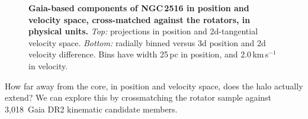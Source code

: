 \documentclass[12pt,twocolumn,tighten]{aastex63}
\newcommand{\nkinematic}{3{,}018\ } %
\begin{document}
\begin{figure}[t]
	\begin{center}
		\leavevmode
	
	\end{center}
	\vspace{-0.7cm}
	\caption{ {\bf Gaia-based components of NGC\,2516 in position and
    velocity space, cross-matched against the rotators, in physical
    units.}
    {\it Top:} projections in position and 2d-tangential velocity
    space. {\it Bottom:} radially binned versus 3d position and
    2d velocity difference.
    Bins have width 25\,pc in position, and 2.0\,km\,s$^{-1}$ in
    velocity.
		\label{fig:physical_x_rotn}
	}
\end{figure}

How far away from the core, in position and velocity space, does the
halo actually extend?  We can explore this by crossmatching the
rotator sample against \nkinematic Gaia DR2 kinematic candidate
members.  
\end{document}

